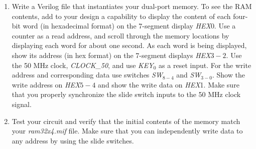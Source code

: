 \documentclass[epsfig,10pt,fullpage]{article}
\newcommand{\CommonDocsPath}{../../../common/docs}
\begin{document}
\begin{enumerate}
\begin{figure}[H]
\begin{center}
\begin{minipage}[t]{12.5 cm}
\begin{tabbing}
{\bf DEPTH} = 32;\\
{\bf WIDTH} = 4;\\
{\bf ADDRESS\_RADIX} = HEX;\\
{\bf DATA\_RADIX} = BIN;\\
{\bf CONTENT}\\
{\bf BEGIN}\\
\\
0 : 0000;\\
1 : 0001;\\
2 : 0010;\\
3 : 0011;\\
$\ldots$ (some lines not shown)\\
1E : 1110;\\
1F : 1111;\\
\\
{\bf END};\\
\end{tabbing}
\end{minipage}
\end{center}
\caption{An example memory initialization file (MIF).}
\label{fig:mif}
\end{figure}

\item Write a Verilog file that instantiates your dual-port memory. 
To see the RAM contents, add to your design a capability to display the
content of each four-bit word (in hexadecimal format) on the 7-segment display
{\it HEX}0. Use a counter as a read address, and scroll through the memory locations 
by displaying each word for about one second. As each word is being displayed, show its 
address (in hex format) on the 7-segment displays {\it HEX}$3-2$. Use the 50 MHz 
clock, {\it CLOCK\_50}, and use {\it KEY}$_0$ as a reset input. For 
the write address and corresponding data use switches {\it SW}$_{8-4}$ and {\it SW}$_{3-0}$.
Show the write address on {\it HEX}$5-4$ and show the write data on {\it HEX}1.
Make sure that you properly synchronize the slide switch inputs to the 50 MHz clock signal.

\item Test your circuit and verify that the initial contents of the memory match
your {\it ram32x4.mif} file. Make sure that you can independently write data to any
address by using the slide switches.
\end{enumerate}



\end{document}
